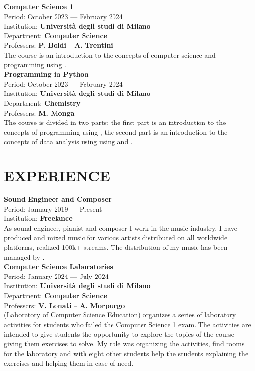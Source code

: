 \documentclass[a4paper,9pt]{extarticle}
\begin{document}
\noindent
\textbf{Computer Science 1} \\
Period: October 2023 --- February 2024 \\
Institution: \textbf{Universit\`a degli studi di Milano} \\
Department: \textbf{Computer Science} \\
Professors: \textbf{P. Boldi} -- \textbf{A. Trentini} \\
The course is an introduction to the concepts of computer science and programming using \golang. \\

\noindent
\textbf{Programming in Python} \\
Period: October 2023 --- February 2024 \\
Institution: \textbf{Universit\`a degli studi di Milano} \\
Department: \textbf{Chemistry} \\
Professors: \textbf{M. Monga} \\
The course is divided in two parts: the first part is an introduction to the concepts of programming using \python, the second part is an introduction to the concepts of data analysis using \python using \numpy and \pandas. \\


\section*{EXPERIENCE}

\noindent
\newline
\textbf{Sound Engineer and Composer} \\
Period: January 2019 --- Present \\
Institution: \textbf{Freelance} \\
As sound engineer, pianist and composer I work in the music industry. I have produced and mixed music for various artists distributed on all worldwide platforms, realized 100k+ streams. The distribution of my music has been managed by \believe. \\

\noindent
\textbf{Computer Science Laboratories} \\
Period: January 2024 --- July 2024 \\
Institution: \textbf{Universit\`a degli studi di Milano} \\
Department: \textbf{Computer Science} \\
Professors: \textbf{V. Lonati} -- \textbf{A. Morpurgo} \\
\aladdin (Laboratory of Computer Science Education) organizes a series of laboratory activities for students who failed the Computer Science 1 exam. The activities are intended to give students the opportunity to explore the topics of the course giving them exercises to solve.
My role was organizing the activities, find rooms for the laboratory and with eight other students help the students explaining the exercises and helping them in case of need. \\
\end{document}
